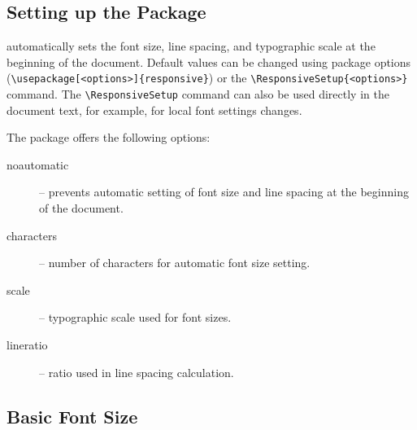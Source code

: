 \documentclass{ltugboat}
\begin{document}
\subsection{Setting up the  Package}

 automatically sets the font size, line spacing, and
typographic scale at the beginning of the document. Default values can be
changed using package options (\verb|\usepackage[<options>]{responsive}|) or
the \verb|\ResponsiveSetup{<options>}| command. The \verb|\ResponsiveSetup|
command can also be used directly in the document text, for example, for local
font settings changes.

The  package offers the following options:

\begin{description}
  \item[noautomatic] – prevents automatic setting of font size and line spacing
    at the beginning of the document.
  \item[characters] – number of characters for automatic font size setting.
  \item[scale] – typographic scale used for font sizes.
  \item[lineratio] – ratio used in line spacing calculation.
\end{description}

\subsection{Basic Font Size}
\end{document}
